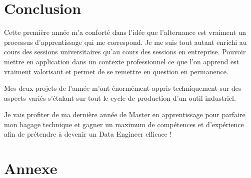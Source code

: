 \documentclass[12pt]{report}
\begin{document}
	\chapter*{Conclusion}
	Cette première année m'a conforté dans l'idée que l'alternance est vraiment un processus d'apprentissage qui me correspond. Je me suis tout autant enrichi au cours des sessions universitaires qu'au cours des sessions en entreprise. Pouvoir mettre en application dans un contexte professionnel ce que l'on apprend est vraiment valorisant et permet de se remettre en question en permanence.
	
	Mes deux projets de l'année m'ont énormément appris techniquement sur des aspects variés s'étalant sur tout le cycle de production d'un outil industriel.
	
	Je vais profiter de ma dernière année de Master en apprentissage pour parfaire mon bagage technique et gagner un maximum de compétences et d'expérience afin de prétendre à devenir un Data Engineer efficace !
	
	\newpage
	\newpage
	\chapter{Annexe}
	
\end{document}
